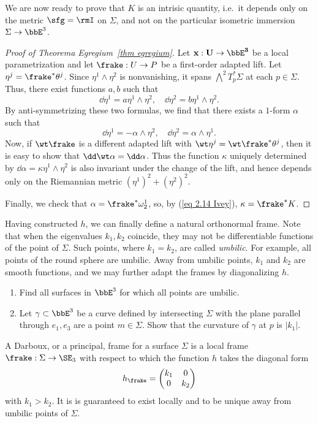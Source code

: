 We are now ready to prove that $K$ is an intrisic quantity, i.e.\ it depends only on the metric $\sfg=\rmI$ on $\Sigma$, and not on the particular isometric immersion $\Sigma\to \bbE^3$.

\begin{proof}[Proof of Theorema Egregium~\ref{thm egregium}]
    Let $\bf{x}:U\to \bbE^3$ be a local parametrization and let $\frake:U\to P$ be a first-order adapted lift. Let $\eta^j=\frake^\ast\theta^j$. Since $\eta^1\wedge\eta^2$ is nonvanishing, it spans $\bigwedge^2 T_p^\ast\Sigma$ at each $p\in\Sigma$. Thus, there exist functions $a,b$ such that 
    \[\dd\eta^1=a\eta^1\wedge\eta^2,\quad \dd\eta^2=b\eta^1\wedge \eta^2.\]
    By anti-symmetrizing these two formulas, we find that there exists a $1$-form $\alpha$ such that 
    \[\dd\eta^1=-\alpha\wedge\eta^2,\quad \dd\eta^2=\alpha\wedge\eta^1.\]
    Now, if $\wt\frake$ is a different adapted lift with $\wt\eta^j=\wt\frake^\ast\theta^j$, then it is easy to show that $\dd\wt\alpha=\dd\alpha$. Thus the function $\kappa$ uniquely determined by $\dd\alpha=\kappa\eta^1\wedge\eta^2$ is also invariant under the change of the lift, and hence depends only on the Riemannian metric $(\eta^1)^2+(\eta^2)^2$.

    Finally, we check that $\alpha=\frake^\ast\omega_2^1$, so, by (\ref{eq 2.14 Ivey}), $\kappa=\frake^\ast K$.
\end{proof}

Having constructed $h$, we can finally define a natural orthonormal frame. Note that when the eigenvalues $k_1,k_2$ coincide, they may not be differentiable functions of the point of $\Sigma$. Such points, where $k_1=k_2$, are called \emph{umbilic}. For example, all points of the round sphere are umbilic. Away from umbilic points, $k_1$ and $k_2$ are smooth functions, and we may further adapt the frames by diagonalizing $h$. 

\begin{xca}
    \begin{enumerate}
        \item Find all surfaces in $\bbE^3$ for which all points are umbilic.
        \item Let $\gamma\subset\bbE^3$ be a curve defined by intersecting $\Sigma$ with the plane parallel through $e_1,e_3$ are a point $m\in\Sigma$. Show that the curvature of $\gamma$ at $p$ is $|k_1|$.
    \end{enumerate}
\end{xca}


\begin{defn}
    A Darboux, or a principal, frame for a surface $\Sigma$ is a local frame $\frake:\Sigma\to \SE_3$ with respect to which the function $h$ takes the diagonal form 
    \[h_\frake=\begin{pmatrix}
        k_1&0\\
        0& k_2
    \end{pmatrix}\]
    with $k_1>k_2$. It is is guaranteed to exist locally and to be unique away from umbilic points of $\Sigma$.
\end{defn}


